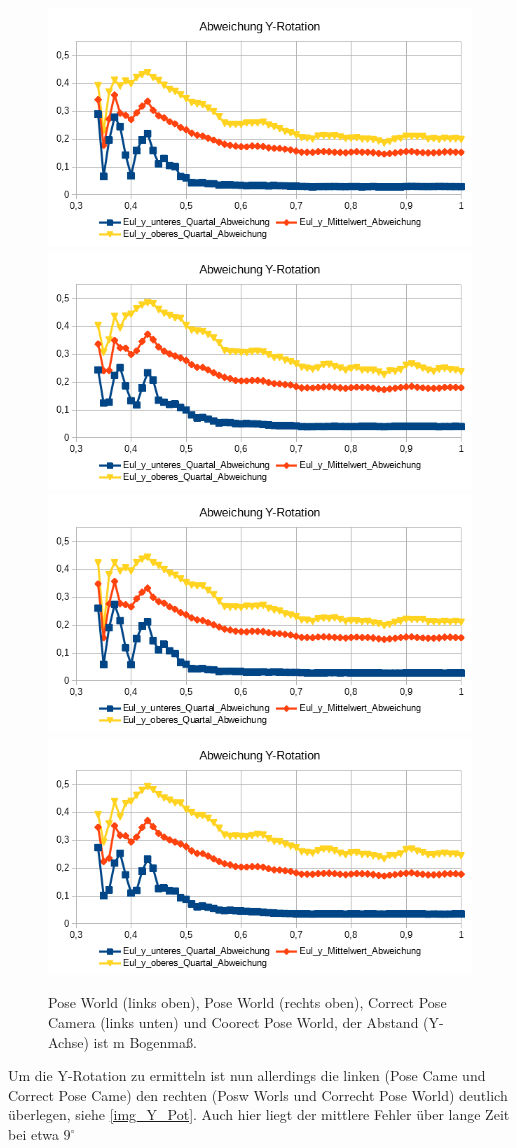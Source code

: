 \begin{figure}
	\centering
	\includegraphics[width=0.45\linewidth]{tabelle/Y_Rot_PC}
	\includegraphics[width=0.45\linewidth]{tabelle/Y_Rot_PW}
	\includegraphics[width=0.45\linewidth]{tabelle/Y_Rot_CPC}
	\includegraphics[width=0.45\linewidth]{tabelle/Y_Rot_CPW}
	\caption{Pose World (links oben), Pose World (rechts oben), Correct Pose Camera (links unten) und Coorect Pose World, der Abstand (Y-Achse) ist m Bogenmaß.}
	\label{img_Y_Pot}
\end{figure}
Um die Y-Rotation zu ermitteln ist nun allerdings die linken (Pose Came und Correct Pose Came) den rechten (Posw Worls und Correcht Pose World) deutlich überlegen, siehe \autoref{img_Y_Pot}. Auch hier liegt der mittlere Fehler über lange Zeit bei etwa $9^\circ$\\
